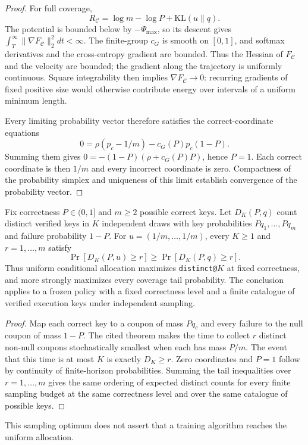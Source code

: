 \begin{proof}
\enforcehalffinalproseline
For full coverage,
\begin{equation}
 R_{\mathcal C}=\log m-\log P+\mathrm{KL}(u\|q).
 \label{eq:replay-mass-uniformity-decomposition}
\end{equation}
The potential is bounded below by $-\Psi_{\max}$, so its descent gives
$\int_T^\infty\|\nabla F_{\mathcal C}\|_2^2dt<\infty$. The finite-group
$c_G$ is smooth on $[0,1]$, and softmax derivatives and the cross-entropy
gradient are bounded. Thus the Hessian of $F_{\mathcal C}$ and the velocity
are bounded; the gradient along the trajectory is uniformly continuous.
Square integrability then implies $\nabla F_{\mathcal C}\to0$: recurring
gradients of fixed positive size would otherwise contribute energy over
intervals of a uniform minimum length.

Every limiting probability vector therefore satisfies the correct-coordinate
equations
\[
 0=\rho(p_c-1/m)-c_G(P)p_c(1-P).
\]
Summing them gives $0=-(1-P)(\rho+c_G(P)P)$, hence $P=1$. Each correct
coordinate is then $1/m$ and every incorrect coordinate is zero. Compactness
of the probability simplex and uniqueness of this limit establish convergence
of the probability vector.
\end{proof}

\begin{corollary}
\enforcehalffinalproseline
\label{cor:coupon-uniform-coverage}
Fix correctness $P\in(0,1]$ and $m\ge2$ possible correct keys.
Let $D_K(P,q)$ count distinct verified keys in $K$ independent draws with
key probabilities $Pq_1,\ldots,Pq_m$ and failure probability $1-P$.
For $u=(1/m,\ldots,1/m)$, every $K\ge1$ and $r=1,\ldots,m$ satisfy
\begin{equation}
 \Pr[D_K(P,u)\ge r]\ge\Pr[D_K(P,q)\ge r].
 \label{eq:coupon-uniform-coverage}
\end{equation}
Thus uniform conditional allocation maximizes \texttt{distinct@}$K$ at
fixed correctness, and more strongly maximizes every coverage tail
probability. The conclusion applies
\citet[Theorem~3, v1]{anceaume2015coupon} to a frozen policy with a fixed
correctness level and a finite catalogue of verified execution keys under
independent sampling.
\end{corollary}
\begin{proof}
\enforcehalffinalproseline
Map each correct key to a coupon of mass $Pq_c$ and every failure to the
null coupon of mass $1-P$. The cited theorem makes the time to collect $r$
distinct non-null coupons stochastically smallest when each has mass $P/m$.
The event that this time is at most $K$ is exactly $D_K\ge r$.
Zero coordinates and $P=1$ follow by continuity of finite-horizon
probabilities. Summing the tail inequalities over $r=1,\ldots,m$ gives the
same ordering of expected distinct counts for every finite sampling budget
at the same correctness level and over the same catalogue of possible keys.
\end{proof}
This sampling optimum does not assert that a training algorithm reaches the
uniform allocation.


